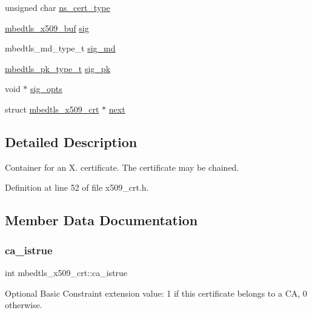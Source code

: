 \begin{DoxyCompactItemize}
\item 
unsigned char \mbox{\hyperlink{structmbedtls__x509__crt_adc36c60aa279fae8bd35a20b9c2bba22}{ns\+\_\+cert\+\_\+type}}
\item 
\mbox{\hyperlink{group__x509__module_ga4d02c9e8e4e2934555e0d132cd2976dc}{mbedtls\+\_\+x509\+\_\+buf}} \mbox{\hyperlink{structmbedtls__x509__crt_aea76ebaa8c8e23129bd905cdc0242a3a}{sig}}
\item 
mbedtls\+\_\+md\+\_\+type\+\_\+t \mbox{\hyperlink{structmbedtls__x509__crt_a5c56937aaf2a51a1d8bc814b142734ca}{sig\+\_\+md}}
\item 
\mbox{\hyperlink{pk_8h_a3fe41eff5605ae727eb9d28dad297020}{mbedtls\+\_\+pk\+\_\+type\+\_\+t}} \mbox{\hyperlink{structmbedtls__x509__crt_a65d5d20352a08c77e173808fde1f8660}{sig\+\_\+pk}}
\item 
void $\ast$ \mbox{\hyperlink{structmbedtls__x509__crt_a67c497ed6535050997c014507a866e9e}{sig\+\_\+opts}}
\item 
struct \mbox{\hyperlink{structmbedtls__x509__crt}{mbedtls\+\_\+x509\+\_\+crt}} $\ast$ \mbox{\hyperlink{structmbedtls__x509__crt_ac9dbc43b90ddd74fe55452495a304923}{next}}
\end{DoxyCompactItemize}


\subsection{Detailed Description}
Container for an X. certificate. The certificate may be chained. 

Definition at line 52 of file x509\+\_\+crt.\+h.



\subsection{Member Data Documentation}
\mbox{\label{structmbedtls__x509__crt_a196b3a43dae5a1c0058f46075f832890}} 
\subsubsection{\texorpdfstring{ca\+\_\+istrue}{ca\_istrue}}
{\footnotesize\ttfamily int mbedtls\+\_\+x509\+\_\+crt\+::ca\+\_\+istrue}

Optional Basic Constraint extension value\+: 1 if this certificate belongs to a CA, 0 otherwise. 

